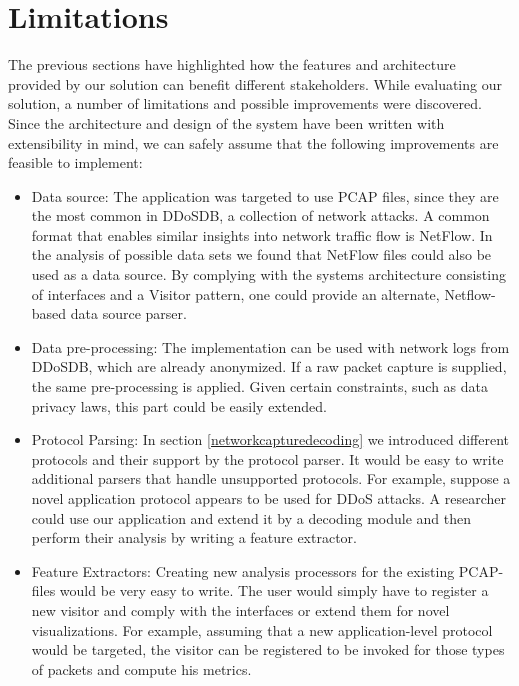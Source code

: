 \section{Limitations}\label{limitations}%
The previous sections have highlighted how the features and architecture provided by our solution can benefit different stakeholders.
While evaluating our solution, a number of limitations and possible improvements were discovered. Since the architecture and design of the system have been written with extensibility in mind, we can safely assume that the following improvements are feasible to implement:
\begin{itemize}

    \item Data source: The application was targeted to use PCAP files, since they are the most common in DDoSDB, a collection of network attacks. A common format that enables similar insights into network traffic flow is NetFlow. In the analysis of possible data sets we found that NetFlow files could also be used as a data source. By complying with the systems architecture consisting of interfaces and a Visitor pattern, one could provide an alternate, Netflow-based data source parser.
    
    \item Data pre-processing: The implementation can be used with network logs from DDoSDB, which are already anonymized. If a raw packet capture is supplied, the same pre-processing is applied. Given certain constraints, such as data privacy laws, this part could be easily extended.
    
    \item Protocol Parsing: 
    In section \ref{networkcapturedecoding} we introduced different protocols and their support by the protocol parser. It would be easy to write additional parsers that handle unsupported protocols. For example, suppose a novel application protocol appears to be used for DDoS attacks. A researcher could use our application and extend it by a decoding module and then perform their analysis by writing a feature extractor.
    
    \item Feature Extractors:
    Creating new analysis processors for the existing PCAP-files would be very easy to write. The user would simply have to register a new visitor and comply with the interfaces or extend them for novel visualizations. For example, assuming that a new application-level protocol would be targeted, the visitor can be registered to be invoked for those types of packets and compute his metrics.
   

\end{itemize}
